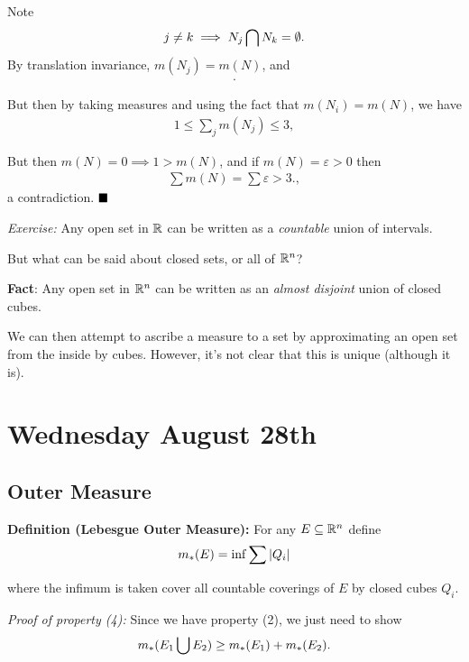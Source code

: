 Note
\begin{align*}
j\neq k \implies N_j \bigcap N_k = \emptyset
.\end{align*} By translation invariance, \(m(N_j) = m(N)\), and
\begin{align*}
[0, 1) \subseteq \disjoint_j N_j \subseteq [-1, 2]
.\end{align*}

But then by taking measures and using the fact that \(m(N_i) = m(N)\),
we have
\begin{align*}
1 \leq \sum_j m(N_j) \leq 3
,\end{align*}

But then \(m(N) = 0 \implies 1 > m(N)\), and if
\(m(N) = \varepsilon> 0\) then
\begin{align*}
\sum m(N) = \sum \varepsilon > 3.
,\end{align*} a contradiction. \(\qed\)

\emph{Exercise:} Any open set in \({\mathbb{R}}\) can be written as a
\emph{countable} union of intervals.

But what can be said about closed sets, or all of \({\mathbb{R}}^n\)?

\textbf{Fact}: Any open set in \({\mathbb{R}}^n\) can be written as an
\emph{almost disjoint} union of closed cubes.

We can then attempt to ascribe a measure to a set by approximating an
open set from the inside by cubes. However, it's not clear that this is
unique (although it is).

\hypertarget{wednesday-august-28th}{%
\section{Wednesday August 28th}\label{wednesday-august-28th}}

\hypertarget{outer-measure}{%
\subsection{Outer Measure}\label{outer-measure}}

\textbf{Definition (Lebesgue Outer Measure):} For any
\(E \subseteq {\mathbb{R}}^n\) define
\begin{align*}
m_*(E) = \inf \sum {\left\lvert {Q_i} \right\rvert}
\end{align*}

where the infimum is taken cover all countable coverings of \(E\) by
closed cubes \(Q_i\).

\emph{Proof of property (4):} Since we have property (2), we just need
to show
\begin{align*}
m_*(E_1 \bigcup E_2) \geq m_*(E_1) + m_*(E_2)
.\end{align*}

